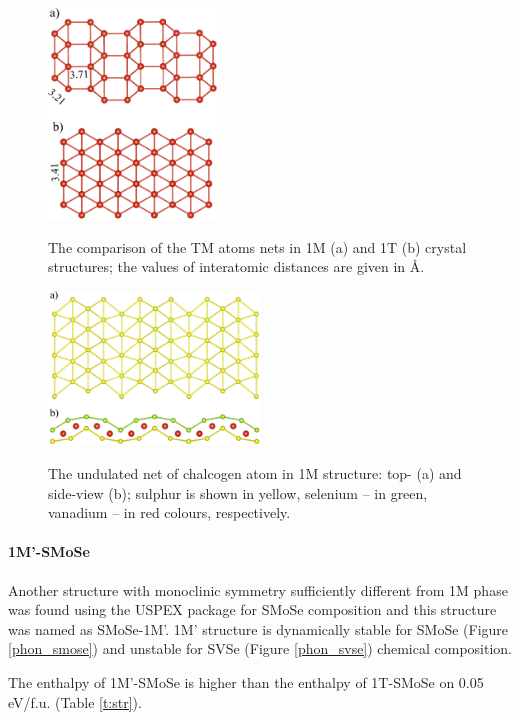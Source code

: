 \documentclass[a4paperm]{article}
\begin{document}
\begin{figure}[H]
	\includegraphics[width=0.4\textwidth]{T_hor_V.png} \\
	\caption{The comparison of the TM atoms nets in 1M (a) and 1T (b) crystal structures; the values of interatomic distances are given in \AA.}
	\label{T_hor_V}
\end{figure}

\begin{figure}[H]
        \includegraphics[width=0.5\textwidth]{T_hor_hcb.png} \\
        \caption{The undulated net of chalcogen atom in 1M structure: top- (a) and side-view (b); sulphur is shown in yellow, selenium -- in green, vanadium -- in red colours, respectively.}
\label{T_hor_hcb}
\end{figure}



\paragraph{1M'-SMoSe}
Another structure with monoclinic symmetry sufficiently different from 1M phase was found using the USPEX package for SMoSe composition and this structure was named as SMoSe-1M'.
1M' structure is dynamically stable for SMoSe (Figure \ref{phon_smose}) and unstable for SVSe (Figure \ref{phon_svse}) chemical composition.

The enthalpy of 1M'-SMoSe is higher than the enthalpy of 1T-SMoSe on 0.05 eV/f.u. (Table \ref{t:str}). 
\end{document}
